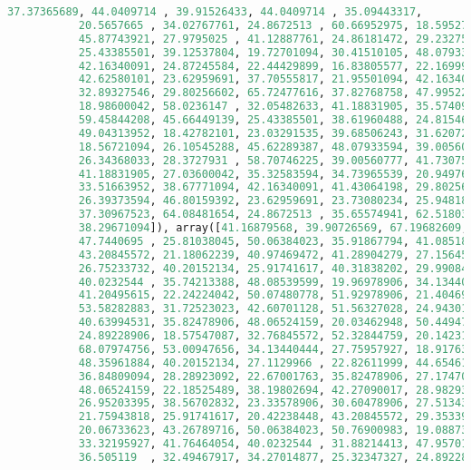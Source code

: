 \documentclass{article}
\begin{document}
\begin{lstlisting}[language=Python,basicstyle=\ttfamily]
           37.37365689, 44.0409714 , 39.91526433, 44.0409714 , 35.09443317,
           20.5657665 , 34.02767761, 24.8672513 , 60.66952975, 18.59527424,
           45.87743921, 27.9795025 , 41.12887761, 24.86181472, 29.23275127,
           25.43385501, 39.12537804, 19.72701094, 30.41510105, 48.07933594,
           42.16340091, 24.87245584, 22.44429899, 16.83805577, 22.16999276,
           42.62580101, 23.62959691, 37.70555817, 21.95501094, 42.16340091,
           32.89327546, 29.80256602, 65.72477616, 37.82768758, 47.99522967,
           18.98600042, 58.0236147 , 32.05482633, 41.18831905, 35.57409983,
           59.45844208, 45.66449139, 25.43385501, 38.61960488, 24.81546094,
           49.04313952, 18.42782101, 23.03291535, 39.68506243, 31.62072377,
           18.56721094, 26.10545288, 45.62289387, 48.07933594, 39.00560777,
           26.34368033, 28.3727931 , 58.70746225, 39.00560777, 41.73075311,
           41.18831905, 27.03600042, 35.32583594, 34.73965539, 20.94976508,
           33.51663952, 38.67771094, 42.16340091, 41.43064198, 29.80256602,
           26.39373594, 46.80159392, 23.62959691, 23.73080234, 25.94818782,
           37.30967523, 64.08481654, 24.8672513 , 35.65574941, 62.51803703,
           38.29671094]), array([41.16879568, 39.90726569, 67.19682609, 36.505119  , 22.19894936,
           47.7440695 , 25.81038045, 50.06384023, 35.91867794, 41.08518588,
           43.20845572, 21.18062239, 40.97469472, 41.28904279, 27.15645572,
           26.75233732, 40.20152134, 25.91741617, 40.31838202, 29.99084169,
           40.0232544 , 35.74213388, 48.08539599, 19.96978906, 34.13440444,
           41.20495615, 22.24224042, 50.07480778, 51.92978906, 21.40469815,
           53.58282883, 31.72523023, 42.60701128, 51.56327028, 24.94301128,
           40.63994531, 35.82478906, 48.06524159, 20.03462948, 50.44947492,
           24.89228906, 18.57547087, 32.76845572, 52.32844759, 20.14231242,
           68.07974756, 53.00947656, 34.13440444, 27.75957927, 18.91763388,
           48.35961884, 40.20152134, 27.1129966 , 22.82611999, 44.65461939,
           36.84809094, 28.28923092, 22.67001763, 35.82478906, 27.17470334,
           48.06524159, 22.18525489, 38.19802694, 42.27090017, 28.98293626,
           26.95203395, 38.56702832, 23.33578906, 30.60478906, 27.51343312,
           21.75943818, 25.91741617, 20.42238448, 43.20845572, 29.35339371,
           20.06733623, 43.26789716, 50.06384023, 50.76900983, 19.08873642,
           33.32195927, 41.76464054, 40.0232544 , 31.88214413, 47.95701732,
           36.505119  , 32.49467917, 34.27014877, 25.32347327, 24.89228906,

\end{lstlisting}
\end{document}
